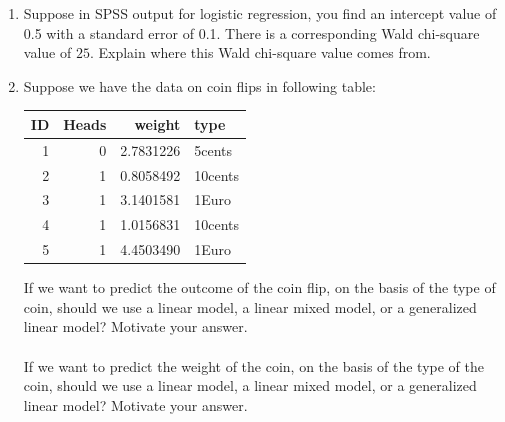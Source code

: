 \documentclass[]{report}\usepackage[]{graphicx}\usepackage[]{color}
\newenvironment{knitrout}{}{} %
\begin{document}
\begin{enumerate}
\item
Suppose in SPSS output for logistic regression, you find an intercept value of 0.5 with a standard error of 0.1. There is a corresponding Wald chi-square value of $25$. Explain where this Wald chi-square value comes from.

\item

Suppose we have the data on coin flips in following table:

\begin{knitrout}
\color{fgcolor}
\begin{tabular}{r|r|r|l}
\hline
ID & Heads & weight & type\\
\hline
1 & 0 & 2.7831226 & 5cents\\
\hline
2 & 1 & 0.8058492 & 10cents\\
\hline
3 & 1 & 3.1401581 & 1Euro\\
\hline
4 & 1 & 1.0156831 & 10cents\\
\hline
5 & 1 & 4.4503490 & 1Euro\\
\hline
\end{tabular}


\end{knitrout}

If we want to predict the outcome of the coin flip, on the basis of the type of coin, should we use a linear model, a linear mixed model, or a generalized linear model? Motivate your answer.
\\
\\
If we want to predict the weight of the coin, on the basis of the type of the coin, should we use a linear model, a linear mixed model, or a generalized linear model? Motivate your answer.


\end{enumerate}
\end{document}
